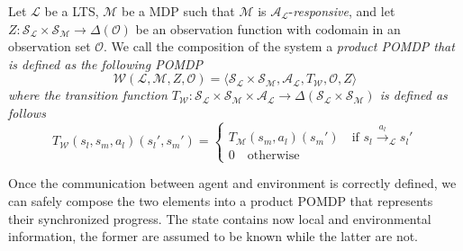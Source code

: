 

\begin{definition}
Let $\mathcal{L}$
be a \ac{LTS}, $\mathcal{M}$
be a \ac{MDP} such that 
$\mathcal{M}$ is $\mathcal{A}_\mathcal{L}$-\emph{responsive}, and let $Z : \mathcal{S}_\mathcal{L} \times \mathcal{S}_\mathcal{M} \rightarrow \Delta(\mathcal{O})$ be an observation function with codomain in an observation set $\mathcal{O}$. We call the composition of the system a \it{product} \ac{POMDP} that is defined as the following \ac{POMDP}
$$ \mathcal{W} (\mathcal{L},\mathcal{M},Z,\mathcal{O}) = \langle \mathcal{S}_\mathcal{L} \times \mathcal{S}_\mathcal{M}, \mathcal{A}_\mathcal{L}, T_\mathcal{W}, \mathcal{O}, Z \rangle$$
where the transition function $T_\mathcal{W} : \mathcal{S}_\mathcal{L} \times \mathcal{S}_\mathcal{M} \times \mathcal{A}_\mathcal{L} \rightarrow \Delta(\mathcal{S}_\mathcal{L} \times \mathcal{S}_\mathcal{M})$ is defined as follows
$$ T_\mathcal{W}(s_l,s_m,a_l)(s_l',s_m') = \begin{cases}
T_\mathcal{M}(s_m,a_l)(s_m') \quad \text{if } s_l\xrightarrow{a_l}_\mathcal{L}s_l' \\ %
0 \quad \text{otherwise}
\end{cases}$$
\end{definition}

Once the communication between agent and environment is correctly defined, we can safely compose the two elements into a product \ac{POMDP} that represents their synchronized progress. The state contains now local and environmental information, the former are assumed to be known while the latter are not. 

